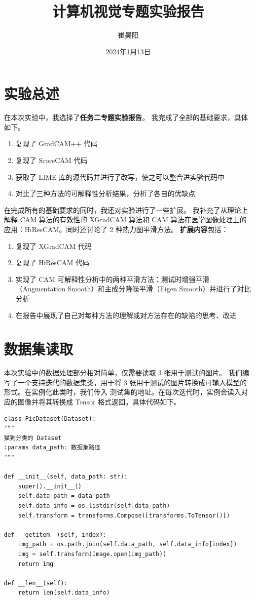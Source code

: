\documentclass[supercite]{Experimental_Report}
\title{~~~~~~计算机视觉专题实验报告~~~~~~}
\author{崔昊阳}
\date{2024年1月13日}
\theoremstyle{definition}
\begin{document}
\maketitle

\clearpage


\tableofcontents[level=2]

\clearpage


\section{实验总述}

在本次实验中，我选择了\textbf{任务二\quad 专题实验报告}。
我完成了全部的基础要求，具体如下。
\begin{enumerate}
	\item 复现了 GradCAM++ 代码
	\item 复现了 ScoreCAM 代码
	\item 获取了 LIME 库的源代码并进行了改写，使之可以整合进实验代码中
	\item 对比了三种方法的可解释性分析结果，分析了各自的优缺点
\end{enumerate}

在完成所有的基础要求的同时，我还对实验进行了一些扩展。
我补充了从理论上解释 CAM 算法的有效性的 XGradCAM 算法和 CAM 算法在医学图像处理上的应用：HiResCAM。同时还讨论了 2 种热力图平滑方法。
\textbf{扩展内容}包括：
\begin{enumerate}
	\item 复现了 XGradCAM 代码
	\item 复现了 HiResCAM 代码
	\item 实现了 CAM 可解释性分析中的两种平滑方法：测试时增强平滑（Augmentation Smooth）和主成分降噪平滑（Eigen Smooth）并进行了对比分析
	\item 在报告中展现了自己对每种方法的理解或对方法存在的缺陷的思考、改进
\end{enumerate}

\section{数据集读取}
本次实验中的数据处理部分相对简单，仅需要读取 3 张用于测试的图片。
我们编写了一个支持迭代的数据集类，用于将 3 张用于测试的图片转换成可输入模型的形式。在实例化此类时，我们传入
测试集的地址。在每次迭代时，实例会读入对应的图像并将其转换成 Tensor 格式返回。具体代码如下。
\begin{lstlisting}
class PicDataset(Dataset):
"""
猫狗分类的 Dataset
:params data_path: 数据集路径
"""

def __init__(self, data_path: str):
    super().__init__()
    self.data_path = data_path
    self.data_info = os.listdir(self.data_path)
    self.transform = transforms.Compose([transforms.ToTensor()])

def __getitem__(self, index):
    img_path = os.path.join(self.data_path, self.data_info[index])
    img = self.transform(Image.open(img_path))
    return img

def __len__(self):
    return len(self.data_info)
\end{lstlisting}
\end{document}
